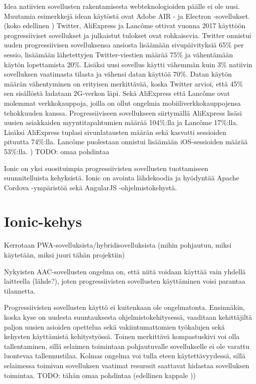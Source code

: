 \documentclass[utf8]{gradu3}
\begin{document}
Idea natiivien sovellusten rakentamisesta webteknologioiden päälle ei ole uusi. Muutamia esimerkkejä idean käytöstä ovat Adobe AIR - ja Electron -sovellukset. (koko edellinen \parencite[]{escaping-tabs}) Twitter, AliExpress ja Lancôme ottivat vuonna 2017 käyttöön progressiiviset sovellukset ja julkaistut tulokset ovat rohkaisevia. Twitter onnistui uuden progressiivisen sovelluksensa ansiosta lisäämään sivupäivityksiä 65\% per sessio, lisäämään lähetettyjen Twitter-viestien määrää 75\% ja vähentämään käytön lopettamista 20\%. Lisäksi uusi sovellus käytti vähemmän kuin 3\% natiivin sovelluksen vaatimasta tilasta ja vähensi datan käyttöä 70\%. Datan käytön määrän vähentyminen on erityisen merkittävää, koska Twitter arvioi, että 45\% sen sisällöstä ladataan 2G-verkon läpi. Sekä AliExpress että Lancôme ovat molemmat verkkokauppoja, joilla on ollut ongelmia mobiiliverkkokauppojensa tehokkuuden kanssa. Progressiiviseen sovellukseen siirtymällä AliExpress lisäsi uusien asiakkaiden myyntitapahtumien määrää 104\%:lla ja Lancôme 17\%:lla. Lisäksi AliExpress tuplasi sivunlatausten määrän sekä kasvatti sessioiden pituutta 74\%:lla. Lancôme puolestaan onnistui lisäämään iOS-sessioiden määrää 53\%:lla. \parencite[]{beginners-guide-pwa})  TODO: omaa pohdintaa

Ionic on yksi suosituimpia progressiivisten sovellusten tuottamiseen suunnitelluista kehyksistä. Ionic on avointa lähdekoodia ja hyödyntää Apache Cordova -ympäristöä sekä AngularJS -ohjelmistokehystä.

\section{Ionic-kehys}

Kerrotaan PWA-sovelluksista/hybridisovelluksista (mihin pohjautuu, miksi käytetään, miksi juuri tähän projektiin)

Nykyisten AAC-sovellusten ongelma on, että niitä voidaan käyttää vain yhdellä laitteella (lähde?), joten progressiivisten sovellusten käyttäminen voisi parantaa tilannetta.

Progressiivisten sovellusten käyttö ei kuitenkaan ole ongelmatonta. Ensinnäkin, koska kyse on uudesta suuntauksesta ohjelmistokehitysessä, vaaditaan kehittäjiltä paljon uusien asioiden opettelua sekä vakiintumattomien työkalujen sekä kehysten käyttämistä kehitystyössä. Toinen merkittävä kompastuskivi voi olla tallentaminen, sillä selaimen toimintaan pohjautuvalle sovellukselle ei ole varattu luontevaa tallennustilaa. Kolmas ongelma voi tulla eteen käytettävyydessä, sillä selaimessa toimivan sovelluksen vaatimat resurssit saattavat hidastaa sovelluksen toimintaa. TODO: tähän omaa pohdintaa (edellinen kappale \parencite[]{pwa-design-challenges}))
\end{document}
